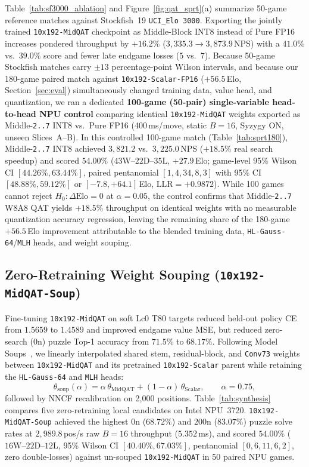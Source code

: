 \documentclass[10pt,twocolumn]{article}
\begin{document}
Table~\ref{tab:sf3000_ablation} and Figure~\ref{fig:qat_sprt}(a) summarize 50-game reference matches against Stockfish~19 \texttt{UCI\_Elo 3000}. Exporting the jointly trained \texttt{10x192-MidQAT} checkpoint as Middle-Block INT8 instead of Pure FP16 increases pondered throughput by $+16.2\%$ ($3{,}335.3 \to 3{,}873.9$\,NPS) with a $41.0\%$ vs.\ $39.0\%$ score and fewer late endgame losses ($5$ vs.\ $7$). Because 50-game Stockfish matches carry ${\pm}13$ percentage-point Wilson intervals, and because our 180-game paired match against \texttt{10x192-Scalar-FP16} ($+56.5$\,Elo, Section~\ref{sec:eval}) simultaneously changed training data, value head, and quantization, we ran a dedicated \textbf{100-game (50-pair) single-variable head-to-head NPU control} comparing identical \texttt{10x192-MidQAT} weights exported as Middle-\texttt{2..7} INT8 vs.\ Pure FP16 (400\,ms/move, static $B=16$, Syzygy ON, unseen Slices~A--B). In this controlled 100-game match (Table~\ref{tab:sprt180}), Middle-\texttt{2..7} INT8 achieved $3{,}821.2$ vs.\ $3{,}225.0$\,NPS ($+18.5\%$ real search speedup) and scored $54.00\%$ ($43\text{W}\text{--}22\text{D}\text{--}35\text{L}$, $+27.9$\,Elo; game-level 95\% Wilson CI $[44.26\%, 63.44\%]$, paired pentanomial $[1, 4, 34, 8, 3]$ with 95\% CI $[48.88\%, 59.12\%]$ or $[-7.8, +64.1]$\,Elo, $\mathrm{LLR} = +0.9872$). While 100 games cannot reject $H_0: \Delta\mathrm{Elo}=0$ at $\alpha=0.05$, the control confirms that Middle-\texttt{2..7} W8A8 QAT yields $+18.5\%$ throughput on identical weights with no measurable quantization accuracy regression, leaving the remaining share of the 180-game $+56.5$\,Elo improvement attributable to the blended training data, \texttt{HL-Gauss-64}/\texttt{MLH} heads, and weight souping.

\subsection{Zero-Retraining Weight Souping (\texttt{10x192-MidQAT-Soup})}
Fine-tuning \texttt{10x192-MidQAT} on soft Lc0 T80 targets reduced held-out policy CE from $1.5659$ to $1.4589$ and improved endgame value MSE, but reduced zero-search ($0\text{n}$) puzzle Top-1 accuracy from $71.5\%$ to $68.17\%$. Following Model Soups~\cite{wortsman2022modelsoups}, we linearly interpolated shared stem, residual-block, and \texttt{Conv73} weights between \texttt{10x192-MidQAT} and its pretrained \texttt{10x192-Scalar} parent while retaining the \texttt{HL-Gauss-64} and \texttt{MLH} heads:
\begin{equation}
  \theta_{\mathrm{soup}}(\alpha) = \alpha\,\theta_{\mathrm{MidQAT}} + (1 - \alpha)\,\theta_{\mathrm{Scalar}}, \qquad \alpha = 0.75,
  \label{eq:soup}
\end{equation}
followed by NNCF recalibration on 2,000 positions. Table~\ref{tab:synthesis} compares five zero-retraining local candidates on Intel NPU~3720. \texttt{10x192-MidQAT-Soup} achieved the highest $0\text{n}$ ($68.72\%$) and $200\text{n}$ ($83.07\%$) puzzle solve rates at $2{,}989.8$\,pos/s raw $B=16$ throughput ($5.352$\,ms), and scored $54.00\%$ ($16\text{W}\text{--}22\text{D}\text{--}12\text{L}$, 95\% Wilson CI $[40.40\%, 67.03\%]$, pentanomial $[0,6,11,6,2]$, zero double-losses) against un-souped \texttt{10x192-MidQAT} in 50 paired NPU games.
\end{document}
